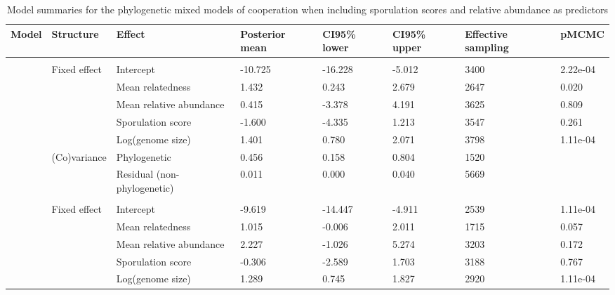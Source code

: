 \begin{table}

\caption{\label{tab:}Model summaries for the phylogenetic mixed models of cooperation when including sporulation scores and relative abundance as predictors}
\centering
\begin{tabular}[t]{llllllll}
\toprule
Model & Structure & Effect & Posterior
 mean & CI95\% lower & CI95\% upper & Effective
 sampling & pMCMC\\
\midrule
\addlinespace[0.3em]
\multicolumn{8}{l}{\textbf{Siderophores}}\\
\hspace{1em} & Fixed effect & Intercept & -10.725 & -16.228 & -5.012 & 3400 & 2.22e-04\\
\hspace{1em} &  & Mean relatedness & 1.432 & 0.243 & 2.679 & 2647 & 0.020\\
\hspace{1em} &  & Mean relative abundance & 0.415 & -3.378 & 4.191 & 3625 & 0.809\\
\hspace{1em} &  & Sporulation score & -1.600 & -4.335 & 1.213 & 3547 & 0.261\\
\hspace{1em} &  & Log(genome size) & 1.401 & 0.780 & 2.071 & 3798 & 1.11e-04\\
\hspace{1em} & (Co)variance & Phylogenetic & 0.456 & 0.158 & 0.804 & 1520 & \\
\hspace{1em} &  & Residual (non-phylogenetic) & 0.011 & 0.000 & 0.040 & 5669 & \\
\addlinespace[0.3em]
\multicolumn{8}{l}{\textbf{Biofilm}}\\
\hspace{1em} & Fixed effect & Intercept & -9.619 & -14.447 & -4.911 & 2539 & 1.11e-04\\
\hspace{1em} &  & Mean relatedness & 1.015 & -0.006 & 2.011 & 1715 & 0.057\\
\hspace{1em} &  & Mean relative abundance & 2.227 & -1.026 & 5.274 & 3203 & 0.172\\
\hspace{1em} &  & Sporulation score & -0.306 & -2.589 & 1.703 & 3188 & 0.767\\
\hspace{1em} &  & Log(genome size) & 1.289 & 0.745 & 1.827 & 2920 & 1.11e-04\\

\end{tabular}
\end{table}
